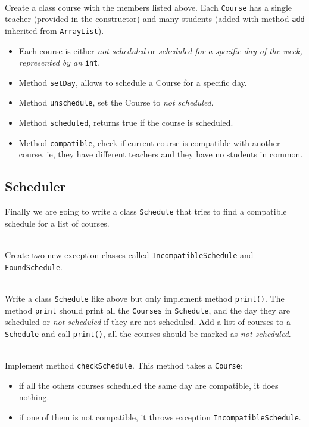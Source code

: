 \documentclass{exercices}
\begin{document}
\begin{exercice}\\
  Create a class course with the members listed above.
  Each \verb!Course! has a single teacher (provided in the constructor) and many students (added with method
  \verb!add! inherited from \verb!ArrayList!).
  \begin{itemize}
  \item
  Each course is either \emph{not scheduled} or \emph{scheduled for a specific day of the week, represented by an} \verb!int!.
  \item
  Method \verb!setDay!, allows to schedule a Course for a specific day.
  \item
  Method \verb!unschedule!, set the Course to \emph{not scheduled}.
  \item
  Method \verb!scheduled!, returns true if the course is scheduled.
  \item
  Method \verb!compatible!, check if current course is compatible with another course. ie, they have different teachers and they have no students in common.
  \end{itemize}
\end{exercice}

\subsection{Scheduler}
Finally we are going to write a class \verb!Schedule! that tries to find a compatible schedule for a list of courses.

\begin{exercice}\\
Create two new exception classes called \verb!IncompatibleSchedule! and \verb!FoundSchedule!.
\end{exercice}


\begin{exercice}\\
Write a class \verb!Schedule! like above but only implement method \verb!print()!.
The method \verb!print! should print all the \verb!Courses! in \verb!Schedule!, and the day they are
scheduled or \emph{not scheduled} if they are not scheduled.
Add a list of courses to a \verb!Schedule! and call \verb!print()!, all the courses should be marked
as \emph{not scheduled}.
\end{exercice}

\begin{exercice}\\
Implement method \verb!checkSchedule!.
This method takes a \verb!Course!:
\begin{itemize}
\item if all the others courses scheduled the same day are compatible, it does nothing.
\item if one of them is not compatible, it throws exception \verb!IncompatibleSchedule!.
\end{itemize}
\end{exercice}
\end{document}
